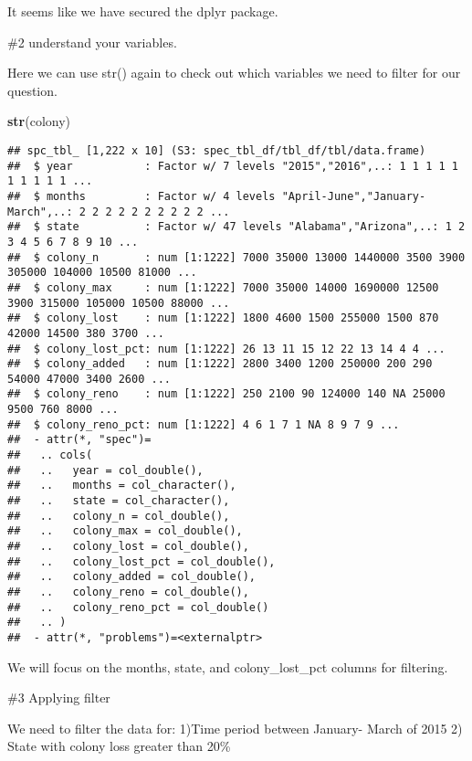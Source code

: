 \documentclass[
]{article}
\newenvironment{Shaded}{\begin{snugshade}}{\end{snugshade}}
\newcommand{\FunctionTok}[1]{\textcolor[rgb]{0.13,0.29,0.53}{\textbf{#1}}}
\newcommand{\NormalTok}[1]{#1}
\begin{document}
It seems like we have secured the dplyr package.

\#2 understand your variables.

Here we can use str() again to check out which variables we need to
filter for our question.

\begin{Shaded}
\begin{Highlighting}[]
\FunctionTok{str}\NormalTok{(colony)}
\end{Highlighting}
\end{Shaded}

\begin{verbatim}
## spc_tbl_ [1,222 x 10] (S3: spec_tbl_df/tbl_df/tbl/data.frame)
##  $ year           : Factor w/ 7 levels "2015","2016",..: 1 1 1 1 1 1 1 1 1 1 ...
##  $ months         : Factor w/ 4 levels "April-June","January-March",..: 2 2 2 2 2 2 2 2 2 2 ...
##  $ state          : Factor w/ 47 levels "Alabama","Arizona",..: 1 2 3 4 5 6 7 8 9 10 ...
##  $ colony_n       : num [1:1222] 7000 35000 13000 1440000 3500 3900 305000 104000 10500 81000 ...
##  $ colony_max     : num [1:1222] 7000 35000 14000 1690000 12500 3900 315000 105000 10500 88000 ...
##  $ colony_lost    : num [1:1222] 1800 4600 1500 255000 1500 870 42000 14500 380 3700 ...
##  $ colony_lost_pct: num [1:1222] 26 13 11 15 12 22 13 14 4 4 ...
##  $ colony_added   : num [1:1222] 2800 3400 1200 250000 200 290 54000 47000 3400 2600 ...
##  $ colony_reno    : num [1:1222] 250 2100 90 124000 140 NA 25000 9500 760 8000 ...
##  $ colony_reno_pct: num [1:1222] 4 6 1 7 1 NA 8 9 7 9 ...
##  - attr(*, "spec")=
##   .. cols(
##   ..   year = col_double(),
##   ..   months = col_character(),
##   ..   state = col_character(),
##   ..   colony_n = col_double(),
##   ..   colony_max = col_double(),
##   ..   colony_lost = col_double(),
##   ..   colony_lost_pct = col_double(),
##   ..   colony_added = col_double(),
##   ..   colony_reno = col_double(),
##   ..   colony_reno_pct = col_double()
##   .. )
##  - attr(*, "problems")=<externalptr>
\end{verbatim}

We will focus on the months, state, and colony\_lost\_pct columns for
filtering.

\#3 Applying filter

We need to filter the data for: 1)Time period between January- March of
2015 2) State with colony loss greater than 20\%
\end{document}
